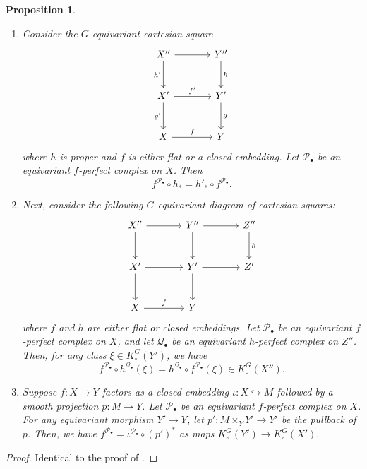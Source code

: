 \documentclass[12pt]{amsart}
\newcommand{\sP}{\mathscr{P}}
\newcommand{\sQ}{\mathscr{Q}}
\newtheorem{Prop}[theorem]{Proposition}
\theoremstyle{definition}
\begin{document}
\begin{Prop}\label{prop: properties pullbacks}
\begin{enumerate}
    \item\label{point 1: prop: properties pullbacks} Consider the $G$-equivariant cartesian square
    \[
    \begin{tikzcd}[row sep=large, column sep=large]
    X'' \arrow[r] \arrow[d, "h'"'] & Y'' \arrow[d, "h"] \\
    X' \arrow[r, "f'"] \arrow[d, "g'"'] & Y' \arrow[d, "g"] \\
    X \arrow[r, "f"] & Y
    \end{tikzcd}
    \]
   where $h$ is proper and $f$ is either flat or a closed embedding.
    Let $\sP_\bullet$ be an equivariant $f$-perfect complex on $X$. Then
    \[
    f^{\sP_\bullet} \circ h_* = h'_* \circ f^{\sP_\bullet}.
    \]
    \item \label{point 2: prop: properties pullbacks}
    Next, consider the following $G$-equivariant diagram of cartesian squares:
    \[
    \begin{tikzcd}[row sep=large, column sep=large]
    X'' \arrow[r] \arrow[d] & Y'' \arrow[r] \arrow[d] & Z'' \arrow[d, "h"] \\
    X' \arrow[r] \arrow[d] & Y' \arrow[r] \arrow[d] & Z'  \\
    X \arrow[r,"f"] & Y  & 
    \end{tikzcd}
    \]
    where $f$ and $h$ are either flat or closed embeddings.  Let $\sP_\bullet$ be an equivariant $f$-perfect complex on $X$, and let $\sQ_\bullet$ be an equivariant $h$-perfect complex on $Z''$. 
    Then, for any class $\xi \in K_\circ^{G}(Y')$, we have
    \[
    f^{\sP_\bullet} \circ h^{\sQ_\bullet} (\xi)
    =
    h^{\sQ_\bullet} \circ f^{\sP_\bullet} (\xi)
    \in K_\circ^{G}(X'').
    \]
    \item\label{point 3: prop: properties pullbacks}
    Suppose \(f : X \to Y\) factors as a closed embedding 
    \(\iota: X \hookrightarrow M\) followed by a smooth projection \(p: M \to Y\). Let \(\sP_\bullet\) be an equivariant $f$-perfect complex on \(X\). 
    For any equivariant morphism \(Y' \to Y\), let $p': M \times_Y Y' \to Y'$ be the pullback of $p$. Then, we have 
    $
    f^{ \sP_\bullet} = \iota^{ \sP_\bullet} \circ (p')^*
    $
    as maps
    $
    K_\circ^{G}(Y') \to K_\circ^{G}(X').
    $
\end{enumerate}
\end{Prop}
\begin{proof}
    Identical to the proof of \cite[Lemmas 3.1, 3.2 and 3.3]{AndersonPayne-OperationalKtheory}.
\end{proof}
\end{document}

